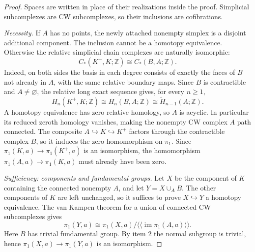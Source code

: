\documentclass[11pt]{article}
\theoremstyle{definition}
\begin{document}
\begin{proof}
Spaces are written in place of their realizations inside the proof. Simplicial
subcomplexes are CW subcomplexes, so their inclusions are cofibrations.

\emph{Necessity.} If $A$ has no points, the newly attached nonempty
simplex is a disjoint additional component. The inclusion cannot be a
homotopy equivalence. Otherwise the relative simplicial chain complexes
are naturally isomorphic:
\[
 C_*(K^+,K;\mathbb Z)\cong C_*(B,A;\mathbb Z).
\]
Indeed, on both sides the basis in each degree consists of exactly the
faces of $B$ not already in $A$, with the same relative boundary maps.
Since $B$ is contractible and $A\neq\varnothing$, the relative long
exact sequence gives, for every $n\geq1$,
\begin{equation}\label{gt:relative-homology}
 H_n(K^+,K;\mathbb Z)\cong H_n(B,A;\mathbb Z)
                       \cong\widetilde H_{n-1}(A;\mathbb Z).
\end{equation}
A homotopy equivalence has zero relative homology, so $A$ is acyclic.
In particular its reduced zeroth homology vanishes, making the nonempty
CW complex $A$ path connected. The composite
$A\hookrightarrow K\hookrightarrow K^+$ factors through the
contractible complex $B$, so it induces the zero homomorphism on
$\pi_1$. Since $\pi_1(K,a)\to\pi_1(K^+,a)$ is an isomorphism,
the homomorphism $\pi_1(A,a)\to\pi_1(K,a)$ must already have been zero.

\emph{Sufficiency: components and fundamental groups.} Let $X$ be the
component of $K$ containing the connected nonempty $A$, and let
$Y=X\cup_A B$. The other components of $K$ are left unchanged, so it
suffices to prove $X\hookrightarrow Y$ a homotopy equivalence.
The van Kampen theorem for a union of connected CW subcomplexes gives
\[
 \pi_1(Y,a)\cong\pi_1(X,a)
       /\langle\!\langle\operatorname{im}\pi_1(A,a)\rangle\!\rangle.
\]
Here $B$ has trivial fundamental group. By item 2 the normal subgroup
is trivial, hence $\pi_1(X,a)\to\pi_1(Y,a)$ is an isomorphism.


\end{proof}
\end{document}
